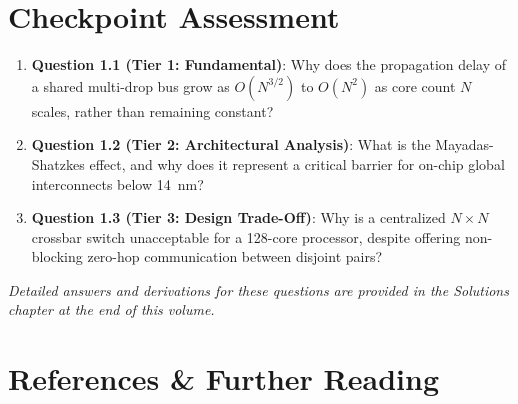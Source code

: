 \section{Checkpoint Assessment}
\label{sec:ch1_assessment}

\begin{enumerate}
    \item \textbf{Question 1.1 (Tier 1: Fundamental)}: Why does the propagation delay of a shared multi-drop bus grow as $O(N^{3/2})$ to $O(N^2)$ as core count $N$ scales, rather than remaining constant?
    \item \textbf{Question 1.2 (Tier 2: Architectural Analysis)}: What is the Mayadas-Shatzkes effect, and why does it represent a critical barrier for on-chip global interconnects below 14~nm?
    \item \textbf{Question 1.3 (Tier 3: Design Trade-Off)}: Why is a centralized $N \times N$ crossbar switch unacceptable for a 128-core processor, despite offering non-blocking zero-hop communication between disjoint pairs?
\end{enumerate}
\emph{Detailed answers and derivations for these questions are provided in the Solutions chapter at the end of this volume.}

\section{References \& Further Reading}
\label{sec:ch1_references}

